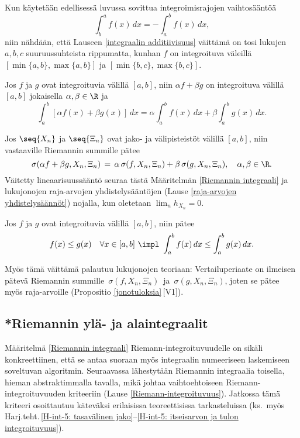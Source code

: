 Kun käytetään edellisessä luvussa sovittua integroimisrajojen vaihtosääntöä
\[
\int_b^a f(x)\, dx=-\int_a^b f(x)\, dx,
\]
niin nähdään, että Lauseen \ref{integraalin additiivisuus} väittämä on tosi lukujen $a,b,c$
suuruussuhteista rippumatta, kunhan $f$ on integroituva väleillä $[\min\{a,b\},\max\{a,b\}]$ ja
$[\min\{b,c\},\max\{b,c\}]$.
\begin{Lause} \label{integraalin lineaarisuus} 
 Jos $f$ ja $g$ ovat integroituvia välillä $[a,b]$, niin
$\alpha f+\beta g$ on integroituva välillä $[a,b]$ jokaisella $\alpha,\beta\in\R$ ja
\[
\int_a^b [\alpha f(x)+\beta g(x)]\,dx = \alpha\int_a^b f(x)\, dx + \beta\int_a^b g(x)\,dx.
\]
\end{Lause}
\tod Jos $\seq{X_n}$ ja $\seq{\Xi_n}$ ovat jako- ja välipisteistöt välillä $[a,b]$, niin
vastaaville Riemannin summille pätee
\[
\sigma(\alpha f+\beta g,X_n,\Xi_n)\,=\,\alpha\,\sigma(f,X_n,\Xi_n)+\beta\,\sigma(g,X_n,\Xi_n),
                                       \quad \alpha,\beta\in\R.
\]
Väitetty lineaarisuussääntö seuraa tästä Määritelmän \ref{Riemannin integraali} ja lukujonojen
raja-arvojen yhdistelysääntöjen (Lause \ref{raja-arvojen yhdistelysäännöt}) nojalla, kun
oletetaan $\lim_nh_{X_n}=0$. \loppu
\begin{Lause} \label{integraalien vertailuperiaate} 
 Jos $f$ ja $g$ ovat integroituvia välillä $[a,b]$,
niin pätee
\[
f(x)\leq g(x)\quad\forall x\in [a,b] \ \impl \ \int_a^b f(x)\, dx\leq\int_a^b g(x)\, dx.
\]
\end{Lause}
\tod Myös tämä väittämä palautuu lukujonojen teoriaan: Vertailuperiaate on ilmeisen pätevä
Riemannin summille $\,\sigma(f,X_n,\Xi_n)\,$ ja $\,\sigma(g,X_n,\Xi_n)$, joten se pätee myös
raja-arvoille (Propositio \ref{jonotuloksia}\,[V1]). \loppu 

 
\subsection*{*Riemannin ylä- ja alaintegraalit}

Määritelmä \ref{Riemannin integraali} Riemann-integroituvuudelle on sikäli konkreettiinen, että
se antaa suoraan myös integraalin numeeriseen laskemiseen soveltuvan algoritmin. Seuraavassa
lähestytään Riemannin integraalia toisella, hieman abstraktimmalla tavalla, mikä
johtaa vaihtoehtoiseen Riemann-integroituvuuden kriteeriin (Lause \ref{Riemann-integroituvuus}).
Jatkossa tämä kriteeri osoittautuu käteväksi erilaisissa teoreettisissa tarkasteluissa
(ks.\ myös Harj.teht.\,\ref{H-int-5: tasavälinen jako}--\ref{H-int-5: itseisarvon ja tulon
integroituvuus}).

